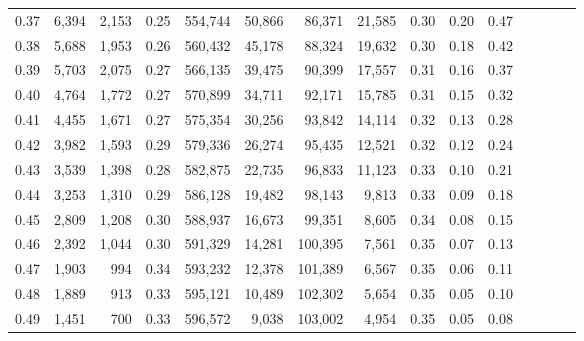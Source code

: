 \begin{tabular}{rrrcrrrrrrrrrrr}
0.37 &   6,394 &  2,153 &                                       0.25 &  554,744 &   50,866 &   86,371 &   21,585 &  0.30 &  0.20 &                         0.47 \\
0.38 &   5,688 &  1,953 &                                       0.26 &  560,432 &   45,178 &   88,324 &   19,632 &  0.30 &  0.18 &                         0.42 \\
0.39 &   5,703 &  2,075 &                                       0.27 &  566,135 &   39,475 &   90,399 &   17,557 &  0.31 &  0.16 &                         0.37 \\
0.40 &   4,764 &  1,772 &                                       0.27 &  570,899 &   34,711 &   92,171 &   15,785 &  0.31 &  0.15 &                         0.32 \\
0.41 &   4,455 &  1,671 &                                       0.27 &  575,354 &   30,256 &   93,842 &   14,114 &  0.32 &  0.13 &                         0.28 \\
0.42 &   3,982 &  1,593 &                                       0.29 &  579,336 &   26,274 &   95,435 &   12,521 &  0.32 &  0.12 &                         0.24 \\
0.43 &   3,539 &  1,398 &                                       0.28 &  582,875 &   22,735 &   96,833 &   11,123 &  0.33 &  0.10 &                         0.21 \\
0.44 &   3,253 &  1,310 &                                       0.29 &  586,128 &   19,482 &   98,143 &    9,813 &  0.33 &  0.09 &                         0.18 \\
0.45 &   2,809 &  1,208 &                                       0.30 &  588,937 &   16,673 &   99,351 &    8,605 &  0.34 &  0.08 &                         0.15 \\
0.46 &   2,392 &  1,044 &                                       0.30 &  591,329 &   14,281 &  100,395 &    7,561 &  0.35 &  0.07 &                         0.13 \\
0.47 &   1,903 &    994 &                                       0.34 &  593,232 &   12,378 &  101,389 &    6,567 &  0.35 &  0.06 &                         0.11 \\
0.48 &   1,889 &    913 &                                       0.33 &  595,121 &   10,489 &  102,302 &    5,654 &  0.35 &  0.05 &                         0.10 \\
0.49 &   1,451 &    700 &                                       0.33 &  596,572 &    9,038 &  103,002 &    4,954 &  0.35 &  0.05 &                         0.08 \\

\end{tabular}
